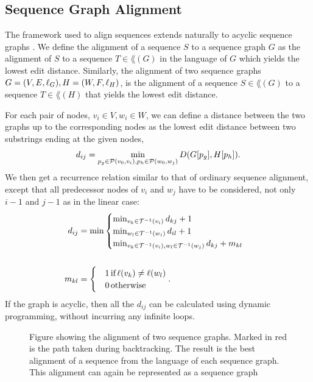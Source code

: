 \subsection{Sequence Graph Alignment}
The framework used to align sequences extends naturally to acyclic sequence graphs \cite{hein, poa}.
We define the alignment of a sequence $S$ to a sequence graph $G$ as the alignment of $S$ to a sequence $T \in \lang(G)$ in the language of $G$ which yields the lowest edit distance.
Similarly, the alignment of two sequence graphs $G=(V, E, \slabel_G), H=(W, F, \slabel_H)$, is the alignment of a sequence $S \in \lang(G)$ to a sequence $T \in \lang(H)$ that yields the lowest edit distance.

For each pair of nodes, $v_i \in V, w_i \in W$, we can define a distance between the two graphs up to the corresponding nodes as the lowest edit distance between two substrings ending at the given nodes,
\[
  d_{ij} = \min_{p_g \in \paths(v_0, v_i), p_h \in \paths(w_0, w_j)} D(G[p_g], H[p_h]).
\]
We then get a recurrence relation similar to that of ordinary sequence alignment, except that all predecessor nodes of $v_i$ and $w_j$ have to be considered, not only $i-1$ and $j-1$ as in the linear case:
\begin{align*}
  d_{ij} &= \min \begin{cases}
    \min_{v_k \in \preds(v_i)} d_{kj} + 1\\
    \min_{w_l \in \preds(w_i)} d_{il} +1 \\
    \min_{v_k \in \preds(v_i), w_l \in \preds(w_j)} d_{kj}+m_{kl}\\
  \end{cases}\\
\\
  m_{kl} &= \begin{cases}
    &1\, \text{if}\, \slabel(v_k) \neq \slabel(w_l)\\
    &0\, \text{otherwise}\\
    \end{cases}.
\end{align*}
If the graph is acyclic, then all the $d_{ij}$ can be calculated using dynamic programming, without incurring any infinite loops.
\begin{figure}
  \begin{tikzpicture}
    
  \end{tikzpicture}
  \caption{
    Figure showing the alignment of two sequence graphs.
    Marked in red is the path taken during backtracking.
    The result is the best alignment of a sequence from the language of each sequence graph.
    This alignment can again be represented as a sequence graph}
    \label{fig:seqgrapha}
\end{figure}

